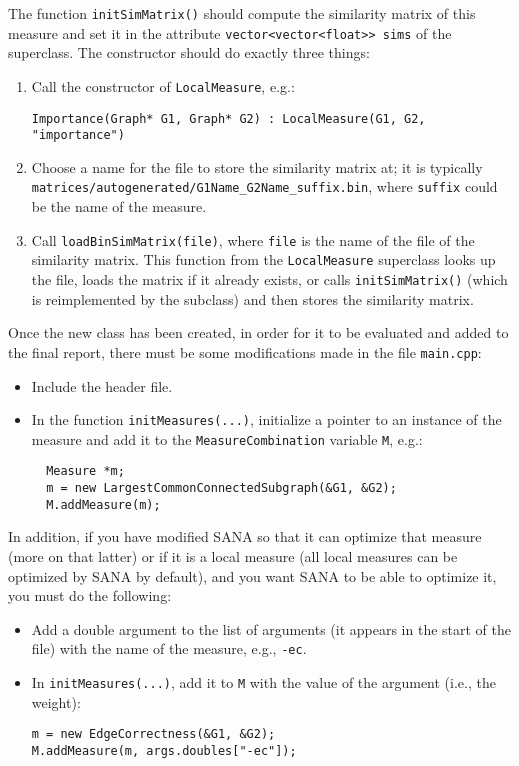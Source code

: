\documentclass[]{article}
\begin{document}
The function \texttt{initSimMatrix()} should compute the similarity matrix of this measure and set it in the attribute \texttt{vector<vector<float>> sims} of the superclass.
The constructor should do exactly three things:
\begin{enumerate}
\item Call the constructor of \texttt{LocalMeasure}, e.g.:
\begin{verbatim}
Importance(Graph* G1, Graph* G2) : LocalMeasure(G1, G2, "importance")
\end{verbatim}
\item Choose a name for the file to store the similarity matrix at; it is typically \texttt{matrices/autogenerated/G1Name\_G2Name\_suffix.bin}, where \texttt{suffix} could be the name of the measure.
\item Call \texttt{loadBinSimMatrix(file)}, where \texttt{file} is the name of the file of the similarity matrix. This function from the \texttt{LocalMeasure} superclass looks up the file, loads the matrix if it already exists, or calls \texttt{initSimMatrix()} (which is reimplemented by the subclass) and then stores the similarity matrix.
\end{enumerate}

Once the new class has been created, in order for it to be evaluated and added to the final report, there must be some modifications made in the file \texttt{main.cpp}:
\begin{itemize}
\item Include the header file.
\item In the function \texttt{initMeasures(...)}, initialize a pointer to an instance of the measure and add it to the \texttt{MeasureCombination} variable \texttt{M}, e.g.:
\begin{verbatim}
  Measure *m;
  m = new LargestCommonConnectedSubgraph(&G1, &G2);
  M.addMeasure(m);
\end{verbatim}
\end{itemize}
In addition, if you have modified SANA so that it can optimize that measure (more on that latter) or if it is a local measure (all local measures can be optimized by SANA by default), and you want SANA to be able to optimize it, you must do the following:
\begin{itemize}
\item Add a double argument to the list of arguments (it appears in the start of the file) with the name of the measure, e.g., \texttt{-ec}.
\item In \texttt{initMeasures(...)}, add it to \texttt{M} with the value of the argument (i.e., the weight):
\begin{verbatim}
m = new EdgeCorrectness(&G1, &G2);
M.addMeasure(m, args.doubles["-ec"]);
\end{verbatim}
\end{itemize}
\end{document}
